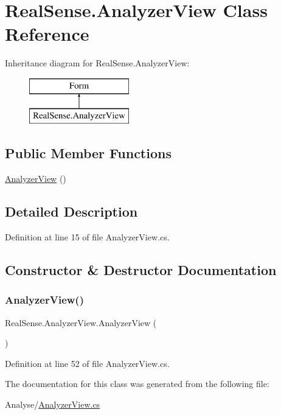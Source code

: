 \hypertarget{class_real_sense_1_1_analyzer_view}{}\section{Real\+Sense.\+Analyzer\+View Class Reference}
\label{class_real_sense_1_1_analyzer_view}
Inheritance diagram for Real\+Sense.\+Analyzer\+View\+:\begin{figure}[H]
\begin{center}
\leavevmode
\includegraphics[height=2.000000cm]{class_real_sense_1_1_analyzer_view}
\end{center}
\end{figure}
\subsection*{Public Member Functions}
\begin{DoxyCompactItemize}
\item 
\hyperlink{class_real_sense_1_1_analyzer_view_ae982969308d52738e20d686cd24b88e8}{Analyzer\+View} ()
\end{DoxyCompactItemize}


\subsection{Detailed Description}


Definition at line 15 of file Analyzer\+View.\+cs.



\subsection{Constructor \& Destructor Documentation}
\mbox{\label{class_real_sense_1_1_analyzer_view_ae982969308d52738e20d686cd24b88e8}} 
\subsubsection{\texorpdfstring{Analyzer\+View()}{AnalyzerView()}}
{\footnotesize\ttfamily Real\+Sense.\+Analyzer\+View.\+Analyzer\+View (\begin{DoxyParamCaption}{ }\end{DoxyParamCaption})}



Definition at line 52 of file Analyzer\+View.\+cs.



The documentation for this class was generated from the following file\+:\begin{DoxyCompactItemize}
\item 
Analyse/\hyperlink{_analyzer_view_8cs}{Analyzer\+View.\+cs}\end{DoxyCompactItemize}
